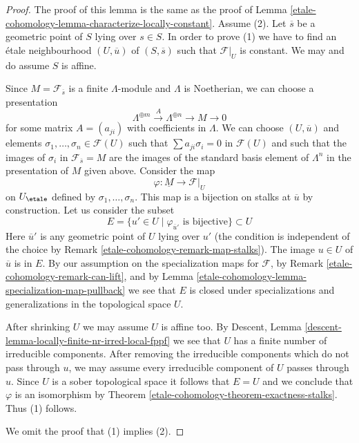 \begin{proof}
The proof of this lemma is the same as the proof of
Lemma \ref{etale-cohomology-lemma-characterize-locally-constant}.
Assume (2). Let $\overline{s}$ be a geometric point of $S$ lying over
$s \in S$. In order to prove (1) we have to find an \'etale neighbourhood
$(U, \overline{u})$ of $(S, \overline{s})$ such that $\mathcal{F}|_U$
is constant. We may and do assume $S$ is affine.

\medskip\noindent
Since $M = \mathcal{F}_{\overline{s}}$ is a finite $\Lambda$-module
and $\Lambda$ is Noetherian, we can choose a presentation
$$
\Lambda^{\oplus m} \xrightarrow{A} \Lambda^{\oplus n} \to M \to 0
$$
for some matrix $A = (a_{ji})$ with coefficients in $\Lambda$.
We can choose $(U, \overline{u})$ and elements
$\sigma_1, \ldots, \sigma_n \in \mathcal{F}(U)$
such that $\sum a_{ji}\sigma_i = 0$ in $\mathcal{F}(U)$ and
such that the images of $\sigma_i$ in $\mathcal{F}_{\overline{s}} = M$
are the images of the standard basis element of
$\Lambda^n$ in the presentation of $M$ given above.
Consider the map
$$
\varphi : \underline{M} \longrightarrow \mathcal{F}|_U
$$
on $U_\etale$ defined by $\sigma_1, \ldots, \sigma_n$.
This map is a bijection on stalks at $\overline{u}$
by construction. Let us consider the subset
$$
E = \{u' \in U \mid \varphi_{\overline{u}'}\text{ is bijective}\} \subset U
$$
Here $\overline{u}'$ is any geometric point of $U$ lying over $u'$
(the condition is independent of the choice by Remark \ref{etale-cohomology-remark-map-stalks}).
The image $u \in U$ of $\overline{u}$ is in $E$.
By our assumption on the specialization maps for $\mathcal{F}$,
by Remark \ref{etale-cohomology-remark-can-lift}, and by
Lemma \ref{etale-cohomology-lemma-specialization-map-pullback}
we see that $E$ is closed under specializations
and generalizations in the topological space $U$.

\medskip\noindent
After shrinking $U$ we may assume $U$ is affine too. By
Descent, Lemma \ref{descent-lemma-locally-finite-nr-irred-local-fppf}
we see that $U$ has a finite number of irreducible components.
After removing the irreducible components which do not pass
through $u$, we may assume every irreducible component of $U$
passes through $u$. Since $U$ is a sober topological space
it follows that $E = U$ and we conclude that $\varphi$ is an isomorphism by
Theorem \ref{etale-cohomology-theorem-exactness-stalks}. Thus (1) follows.

\medskip\noindent
We omit the proof that (1) implies (2).
\end{proof}

